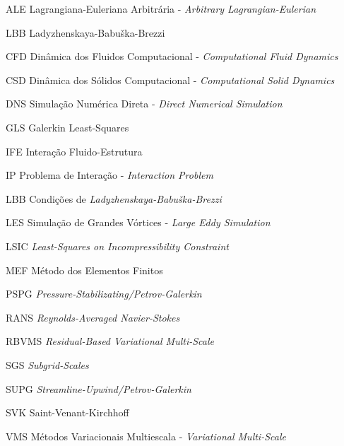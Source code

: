 \begin{siglas}
    \item[ALE] Lagrangiana-Euleriana Arbitrária - \textit{Arbitrary Lagrangian-Eulerian}
    \item[LBB] Ladyzhenskaya-Babuška-Brezzi
    \item[CFD] Dinâmica dos Fluidos Computacional - \textit{Computational Fluid Dynamics}
    \item[CSD] Dinâmica dos Sólidos Computacional - \textit{Computational Solid Dynamics}
    \item[DNS] Simulação Numérica Direta - \textit{Direct Numerical Simulation}
    \item[GLS] Galerkin Least-Squares
    \item[IFE] Interação Fluido-Estrutura
    \item[IP] Problema de Interação - \textit{Interaction Problem}
    \item[LBB] Condições de \textit{Ladyzhenskaya-Babuška-Brezzi}
    \item[LES] Simulação de Grandes Vórtices - \textit{Large Eddy Simulation}
    \item[LSIC] \textit{Least-Squares on Incompressibility Constraint}
    \item[MEF] Método dos Elementos Finitos
    \item[PSPG] \textit{Pressure-Stabilizating/Petrov-Galerkin}
    \item[RANS] \textit{Reynolds-Averaged Navier-Stokes}
    \item[RBVMS] \textit{Residual-Based Variational Multi-Scale}
    \item[SGS] \textit{Subgrid-Scales}
    \item[SUPG] \textit{Streamline-Upwind/Petrov-Galerkin}
    \item[SVK] Saint-Venant-Kirchhoff
    \item[VMS] Métodos Variacionais Multiescala - \textit{Variational Multi-Scale}
\end{siglas}